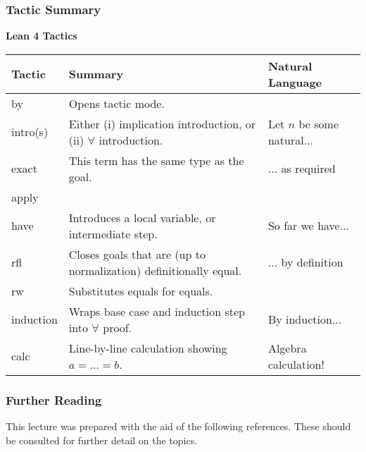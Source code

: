 \documentclass{beamer}
\theoremstyle{indentDefn} \newtheorem{defn}[]{Definition}
\begin{document}
\begin{frame}
	\frametitle{Tactic Summary}
	
	\begin{table}[htbp]
    \centering
    \renewcommand{\arraystretch}{1.5}
    \textbf{Lean 4 Tactics}\\
    \vspace{0.2cm}        
    \footnotesize
    \begin{tabular}{|l|l|l|}
    \hline
    \textbf{Tactic} & \textbf{Summary} & \textbf{Natural Language} \\
    \hline
    by & Opens tactic mode. & \\
    intro(s) & Either (i) implication introduction, or (ii) $\forall$ introduction. & Let $n$ be some natural...\\
    exact & This term has the same type as the goal. & ... as required \\
    apply & & \\
    have & Introduces a local variable, or intermediate step. & So far we have... \\
    rfl & Closes goals that are (up to normalization) definitionally equal. & ... by definition \\
    rw & Substitutes equals for equals. & \\
    induction & Wraps base case and induction step into $\forall$ proof. & By induction...\\
    calc & Line-by-line calculation showing $a = \dots = b$. & Algebra calculation!\\
    \hline
    \end{tabular}
\end{table}

\end{frame}

%	
\begin{frame}
	\frametitle{Further Reading}
	
    This lecture was prepared with the aid of the following references. 
    These should be consulted for further detail on the topics. 

    \printbibliography
	
\end{frame}
\end{document}
